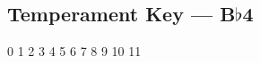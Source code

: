 \subsection{Temperament Key --- \UiKey{\I}\UiKey{\SET}B$\flat$4}









































0
1
2
3
4
5
6
7
8
9
10
11
